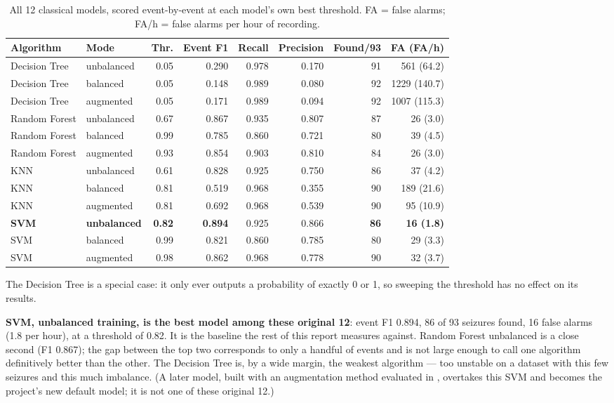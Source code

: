 \begin{table}[H]
  \centering
  \small
  \caption{All 12 classical models, scored event-by-event at each model's own best threshold.
    FA = false alarms; FA/h = false alarms per hour of recording.}
  \label{tab:classical-results}
  \begin{tabular}{llrrrrrr}
    \toprule
    Algorithm & Mode & Thr. & Event F1 & Recall & Precision & Found/93 & FA (FA/h) \\
    \midrule
    Decision Tree & unbalanced & 0.05 & 0.290 & 0.978 & 0.170 & 91 & 561 (64.2) \\
    Decision Tree & balanced   & 0.05 & 0.148 & 0.989 & 0.080 & 92 & 1229 (140.7) \\
    Decision Tree & augmented  & 0.05 & 0.171 & 0.989 & 0.094 & 92 & 1007 (115.3) \\
    Random Forest & unbalanced & 0.67 & 0.867 & 0.935 & 0.807 & 87 & 26 (3.0) \\
    Random Forest & balanced   & 0.99 & 0.785 & 0.860 & 0.721 & 80 & 39 (4.5) \\
    Random Forest & augmented  & 0.93 & 0.854 & 0.903 & 0.810 & 84 & 26 (3.0) \\
    KNN & unbalanced & 0.61 & 0.828 & 0.925 & 0.750 & 86 & 37 (4.2) \\
    KNN & balanced   & 0.81 & 0.519 & 0.968 & 0.355 & 90 & 189 (21.6) \\
    KNN & augmented  & 0.81 & 0.692 & 0.968 & 0.539 & 90 & 95 (10.9) \\
    \textbf{SVM} & \textbf{unbalanced} & \textbf{0.82} & \textbf{0.894} & 0.925 & 0.866 &
      \textbf{86} & \textbf{16 (1.8)} \\
    SVM & balanced   & 0.99 & 0.821 & 0.860 & 0.785 & 80 & 29 (3.3) \\
    SVM & augmented  & 0.98 & 0.862 & 0.968 & 0.778 & 90 & 32 (3.7) \\
    \bottomrule
  \end{tabular}
\end{table}

The Decision Tree is a special case: it only ever outputs a probability of exactly 0 or 1, so
sweeping the threshold has no effect on its results.

\textbf{SVM, unbalanced training, is the best model among these original 12}: event F1 0.894, 86
of 93 seizures found, 16 false alarms (1.8 per hour), at a threshold of 0.82. It is the baseline
the rest of this report measures against. Random Forest unbalanced is a close second (F1 0.867);
the gap between the top two corresponds to only a handful of events and is not large enough to
call one algorithm definitively better than the other. The Decision Tree is, by a wide margin,
the weakest algorithm --- too unstable on a dataset with this few seizures and this much
imbalance. (A later model, built with an augmentation method evaluated in
, overtakes this SVM and becomes the project's new default model; it is
not one of these original 12.)

